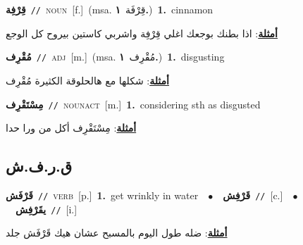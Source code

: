 \documentclass[10pt,a4paper,twoside]{article} %
\begin{document}
\begin{multicols}{2}
{\setlength\topsep{0pt}\textbf{\foreignlanguage{arabic}{قِرْفِة}}\ {\color{gray}\texttt{//}\color{black}}\ \textsc{noun}\ [f.]\ \color{gray}(msa. \foreignlanguage{arabic}{قِرْفَة}~\foreignlanguage{arabic}{\textbf{١.}})\color{black}\ \textbf{1.}~cinnamon\  \begin{flushright}\color{gray}\foreignlanguage{arabic}{\textbf{\underline{\foreignlanguage{arabic}{أمثلة}}}: اذا بطنك بوجعك اغلي قِرْفِة واشربي كاستين بيروح كل الوجع}\end{flushright}\color{black}} \vspace{2mm}

{\setlength\topsep{0pt}\textbf{\foreignlanguage{arabic}{مُقْرِف}}\ {\color{gray}\texttt{//}\color{black}}\ \textsc{adj}\ [m.]\ \color{gray}(msa. \foreignlanguage{arabic}{مُقْرِف}~\foreignlanguage{arabic}{\textbf{١.}})\color{black}\ \textbf{1.}~disgusting\  \begin{flushright}\color{gray}\foreignlanguage{arabic}{\textbf{\underline{\foreignlanguage{arabic}{أمثلة}}}: شكلها مع هالحلوقة الكثيرة مُقْرِف}\end{flushright}\color{black}} \vspace{2mm}

{\setlength\topsep{0pt}\textbf{\foreignlanguage{arabic}{مِسْتَقْرِف}}\ {\color{gray}\texttt{//}\color{black}}\ \textsc{noun\textunderscore act}\ [m.]\ \textbf{1.}~considering sth as disgusted\  \begin{flushright}\color{gray}\foreignlanguage{arabic}{\textbf{\underline{\foreignlanguage{arabic}{أمثلة}}}: مِسْتَقْرِف أكل من ورا حدا}\end{flushright}\color{black}} \vspace{2mm}

\vspace{-3mm}
\subsection*{\color{blue}\foreignlanguage{arabic}{ق.ر.ف.ش}\color{blue}{}} 

{\setlength\topsep{0pt}\textbf{\foreignlanguage{arabic}{قَرْفَش}}\ {\color{gray}\texttt{//}\color{black}}\ \textsc{verb}\ [p.]\ \textbf{1.}~get wrinkly in water\ \ $\bullet$\ \ \setlength\topsep{0pt}\textbf{\foreignlanguage{arabic}{قَرْفِش}}\ {\color{gray}\texttt{//}\color{black}}\ [c.]\ \ $\bullet$\ \ \setlength\topsep{0pt}\textbf{\foreignlanguage{arabic}{يقَرْفِش}}\ {\color{gray}\texttt{//}\color{black}}\ [i.]\  \begin{flushright}\color{gray}\foreignlanguage{arabic}{\textbf{\underline{\foreignlanguage{arabic}{أمثلة}}}: ضله طول اليوم بالمسبح عشان هيك قَرْفَش جلد}\end{flushright}\color{black}} \vspace{2mm}


\end{multicols}
\end{document}
